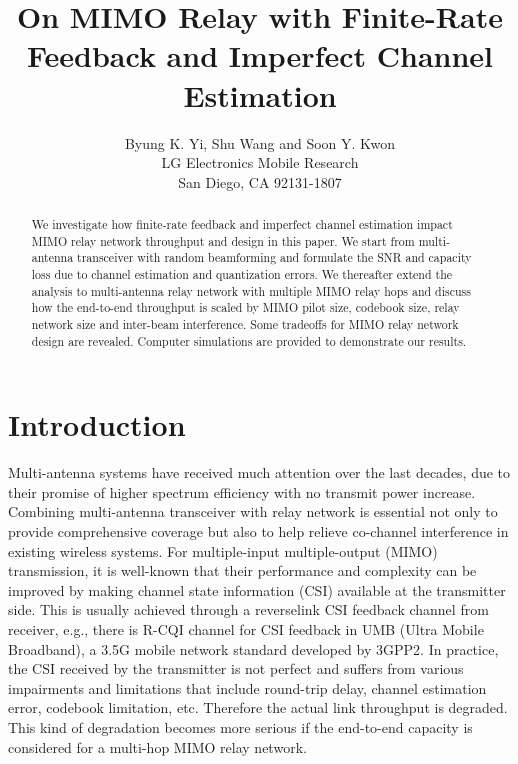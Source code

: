 \documentclass[10pt,fleqn, twocolumn]{IEEEtran}
\title{On MIMO Relay with Finite-Rate Feedback and Imperfect Channel Estimation}
\author{Byung K. Yi, Shu Wang and Soon Y. Kwon\\LG Electronics Mobile Research\\San Diego, CA 92131-1807}
\date{}
\begin{document}
\maketitle
\begin{abstract}\small
We investigate how finite-rate feedback and imperfect channel
estimation impact MIMO relay network throughput and design in this
paper. We start from multi-antenna transceiver with random
beamforming and formulate the SNR and capacity loss due to channel
estimation and quantization errors. We thereafter extend the
analysis to multi-antenna relay network with multiple MIMO relay
hops and discuss how the end-to-end throughput is scaled by MIMO
pilot size, codebook size, relay network size and inter-beam
interference. Some tradeoffs for MIMO relay network design are
revealed. Computer simulations are provided to demonstrate our
results.
\end{abstract}
\section{Introduction}
Multi-antenna systems have received much attention over the last
decades, due to their promise of higher spectrum efficiency with
no transmit power increase. Combining multi-antenna transceiver
with relay network is essential not only to provide comprehensive
coverage but also to help relieve co-channel interference in
existing wireless systems. For multiple-input multiple-output
(MIMO) transmission, it is well-known that their performance and
complexity can be improved by making channel state information
(CSI) available at the transmitter side. This is usually achieved
through a reverselink CSI feedback channel from receiver, e.g.,
there is R-CQI channel for CSI feedback in UMB (Ultra Mobile
Broadband), a 3.5G mobile network standard developed by 3GPP2. In
practice, the CSI received by the transmitter is not perfect and
suffers from various impairments and limitations that include
round-trip delay, channel estimation error, codebook limitation,
etc. Therefore the actual link throughput is degraded. This kind
of degradation becomes more serious if the end-to-end capacity is
considered for a multi-hop MIMO relay network.
\end{document}
